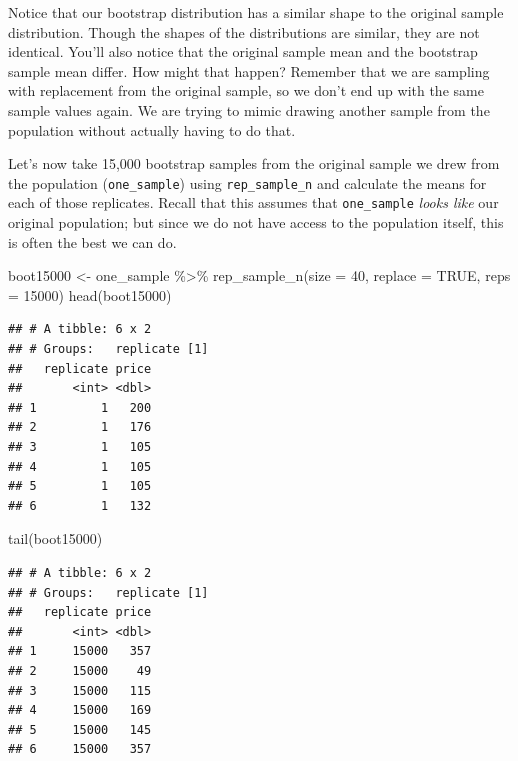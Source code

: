 \documentclass[
]{krantz}
\makeatletter
\newenvironment{Shaded}{\begin{snugshade}}{\end{snugshade}}
\newcommand{\AttributeTok}[1]{\textcolor[rgb]{0.61,0.61,0.61}{#1}}
\newcommand{\ConstantTok}[1]{\textcolor[rgb]{0,0,0}{#1}}
\newcommand{\DecValTok}[1]{\textcolor[rgb]{0.06,0.06,0.06}{#1}}
\newcommand{\FunctionTok}[1]{\textcolor[rgb]{0,0,0}{#1}}
\newcommand{\NormalTok}[1]{#1}
\newcommand{\OtherTok}[1]{\textcolor[rgb]{0.37,0.37,0.37}{#1}}
\newcommand{\SpecialCharTok}[1]{\textcolor[rgb]{0,0,0}{#1}}
\newenvironment{kframe}{%
\medskip{}
\setlength{\fboxsep}{.8em}
 \def\at@end@of@kframe{}%
 \ifinner\ifhmode%
  \def\at@end@of@kframe{\end{minipage}}%
  \begin{minipage}{\columnwidth}%
 \fi\fi%
 \def\FrameCommand##1{\hskip\@totalleftmargin \hskip-\fboxsep
 \colorbox{shadecolor}{##1}\hskip-\fboxsep
     \hskip-\linewidth \hskip-\@totalleftmargin \hskip\columnwidth}%
 \MakeFramed {\advance\hsize-\width
   \@totalleftmargin\z@ \linewidth\hsize
   \@setminipage}}%
 {\par\unskip\endMakeFramed%
 \at@end@of@kframe}
\renewenvironment{Shaded}{\begin{kframe}}{\end{kframe}}
\makeatother
\begin{document}
Notice that our bootstrap distribution has a similar shape to the original
sample distribution. Though the shapes of the distributions are similar, they
are not identical. You'll also notice that the original sample mean and the
bootstrap sample mean differ. How might that happen? Remember that we are
sampling with replacement from the original sample, so we don't end up with the
same sample values again. We are trying to mimic drawing another sample from
the population without actually having to do that.

Let's now take 15,000 bootstrap samples from the original sample we drew from the
population (\texttt{one\_sample}) using \texttt{rep\_sample\_n} and calculate the means for
each of those replicates. Recall that this assumes that \texttt{one\_sample} \emph{looks like}
our original population; but since we do not have access to the population itself,
this is often the best we can do.

\begin{Shaded}
\begin{Highlighting}[]
\NormalTok{boot15000 }\OtherTok{\textless{}{-}}\NormalTok{ one\_sample }\SpecialCharTok{\%\textgreater{}\%}
  \FunctionTok{rep\_sample\_n}\NormalTok{(}\AttributeTok{size =} \DecValTok{40}\NormalTok{, }\AttributeTok{replace =} \ConstantTok{TRUE}\NormalTok{, }\AttributeTok{reps =} \DecValTok{15000}\NormalTok{)}
\FunctionTok{head}\NormalTok{(boot15000)}
\end{Highlighting}
\end{Shaded}

\begin{verbatim}
## # A tibble: 6 x 2
## # Groups:   replicate [1]
##   replicate price
##       <int> <dbl>
## 1         1   200
## 2         1   176
## 3         1   105
## 4         1   105
## 5         1   105
## 6         1   132
\end{verbatim}

\begin{Shaded}
\begin{Highlighting}[]
\FunctionTok{tail}\NormalTok{(boot15000)}
\end{Highlighting}
\end{Shaded}

\begin{verbatim}
## # A tibble: 6 x 2
## # Groups:   replicate [1]
##   replicate price
##       <int> <dbl>
## 1     15000   357
## 2     15000    49
## 3     15000   115
## 4     15000   169
## 5     15000   145
## 6     15000   357
\end{verbatim}
\end{document}
